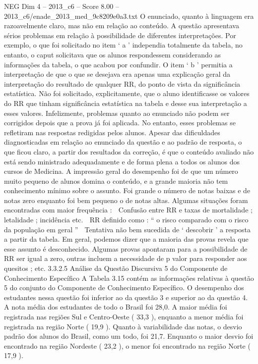\begin{textsample}{NEG Dim 4 – 2013\_c6 – Score 8.00 – 2013\_c6/enade\_2013\_med\_9c8209e0a3.txt}
O enunciado, quanto à linguagem era razoavelmente claro, mas não em relação ao conteúdo.
A questão apresentava sérios problemas em relação à possibilidade de diferentes interpretações.
Por exemplo, o que foi solicitado no item ‘ a ’ independia totalmente da tabela, no entanto, o caput solicitava que os alunos respondessem considerando as informações da tabela, o que acabou por confundir.
O item ‘ b ’ permitia a interpretação de que o que se desejava era apenas uma explicação geral da interpretação do resultado de qualquer RR, do ponto de vista da significância estatística.
Não foi solicitado, explicitamente, que o aluno identificasse os valores do RR que tinham significância estatística na tabela e desse sua interpretação a esses valores.
Infelizmente, problemas quanto ao enunciado não podem ser corrigidos depois que a prova já foi aplicada.
No entanto, esses problemas se refletiram nas respostas redigidas pelos alunos.
Apesar das dificuldades diagnosticadas em relação ao enunciado da questão e ao padrão de resposta, o que ficou claro, a partir dos resultados da correção, é que o conteúdo avaliado não está sendo ministrado adequadamente e de forma plena a todos os alunos dos cursos de Medicina.
A impressão geral do desempenho foi de que um número muito pequeno de alunos domina o conteúdo, e a grande maioria não tem conhecimento mínimo sobre o assunto.
Foi grande o número de notas baixas e de notas zero enquanto foi bem pequeno o de notas altas.
Algumas situações foram encontradas com maior frequência :  Confusão entre RR e taxas de mortalidade ; letalidade ; incidência etc.  RR definido como : “ o risco comparado com o risco da população em geral ”  Tentativa não bem sucedida de ‘ descobrir ’ a resposta a partir da tabela.
Em geral, podemos dizer que a maioria das provas revela que esse assunto é desconhecido.
Algumas provas apontaram para a possibilidade de RR ser igual a zero, outras incluem a necessidade de p valor para responder aos quesitos ; etc. 3.3.2.5 Análise da Questão Discursiva 5 do Componente de Conhecimento Específico A Tabela 3.15 contém as informações relativas à questão 5 do conjunto do Componente de Conhecimento Específico.
O desempenho dos estudantes nessa questão foi inferior ao da questão 3 e superior ao da questão 4.
A nota média dos estudantes de todo o Brasil foi 28,0.
A maior média foi registrada nas regiões Sul e Centro-Oeste ( 33,3 ), enquanto a menor média foi registrada na região Norte ( 19,9 ).
Quanto à variabilidade das notas, o desvio padrão dos alunos do Brasil, como um todo, foi 21,7.
Enquanto o maior desvio foi encontrado na região Nordeste ( 23,2 ), o menor foi encontrado na região Norte ( 17,9 ).

\end{textsample}
